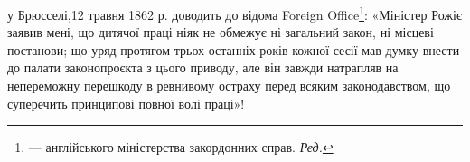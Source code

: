 у Брюсселі,12 травня 1862 р. доводить до відома Foreign Office\footnote*{
— англійського міністерства закордонних справ. \emph{Ред.}
}: «Міністер
Рожіє заявив мені, що дитячої праці ніяк не обмежує ні загальний закон,
ні місцеві постанови; що уряд протягом трьох останніх років кожної сесії
мав думку внести до палати законопроєкта з цього приводу, але він завжди
натрапляв на непереможну перешкоду в ревнивому остраху перед
всяким законодавством, що суперечить принципові повної волі праці»!